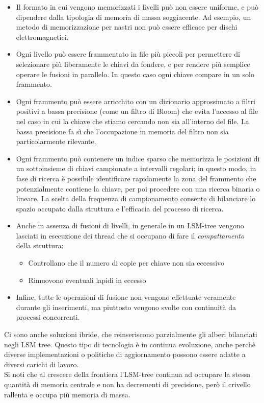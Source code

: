 \begin{itemize}
    \item Il formato in cui vengono memorizzati i livelli può non essere uniforme, e può dipendere dalla tipologia di memoria di massa soggiacente. Ad esempio, un metodo di memorizzazione per nastri non può essere efficace per dischi elettromagnetici.
    \item Ogni livello può essere frammentato in file più piccoli per permettere di selezionare più liberamente le chiavi da fondere, e per rendere più semplice operare le fusioni in parallelo. In questo caso ogni chiave compare in un solo frammento.
    \item Ogni frammento può essere arricchito con un dizionario approssimato a filtri positivi a bassa precisione (come un filtro di Bloom) che evita l'accesso al file nel caso in cui la chiave che stiamo cercando non sia all'interno del file. La bassa precisione fa sì che l'occupazione in memoria del filtro non sia particolarmente rilevante.
    \item Ogni frammento può contenere un indice sparso che memorizza le posizioni di un sottoinsieme di chiavi campionate a intervalli regolari; in questo modo, in fase di ricerca è possibile identificare rapidamente la zona del frammento che potenzialmente contiene la chiave, per poi procedere con una ricerca binaria o lineare. La scelta della frequenza di campionamento consente di bilanciare lo spazio occupato dalla struttura e l'efficacia del processo di ricerca.
    \item Anche in assenza di fusioni di livelli, in generale in un LSM-tree vengono lasciati in esecuzione dei thread che si occupano di fare il \textit{compattamento} della struttura:
    \begin{itemize}
        \item Controllano che il numero di copie per chiave non sia eccessivo
        \item Rimuovono eventuali lapidi in eccesso
    \end{itemize}
    \item Infine, tutte le operazioni di fusione non vengono effettuate veramente durante gli inserimenti, ma piuttosto vengono svolte con continuità da processi concorrenti.
\end{itemize}
Ci sono anche soluzioni ibride, che reinseriscono parzialmente gli alberi bilanciati negli LSM tree. Questo tipo di tecnologia è in continua evoluzione, anche perchè diverse implementazioni o politiche di aggiornamento possono essere adatte a diversi carichi di lavoro.\\
Si noti che al crescere della frontiera l'LSM-tree continua ad occupare la stessa quantità di memoria centrale e non ha decrementi di precisione, però il crivello rallenta e occupa più memoria di massa.
